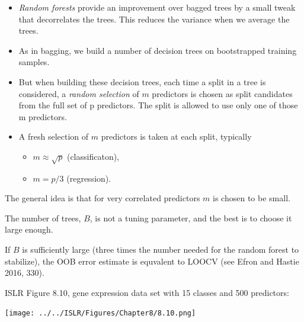 \documentclass[10pt,ignorenonframetext,]{beamer}
\providecommand{\tightlist}{%
  \setlength{\itemsep}{0pt}\setlength{\parskip}{0pt}}
\begin{document}
\begin{frame}

\begin{itemize}
\item
  \emph{Random forests} provide an improvement over bagged trees by a
  small tweak that decorrelates the trees. This reduces the variance
  when we average the trees.
\item
  As in bagging, we build a number of decision trees on bootstrapped
  training samples.
\item
  But when building these decision trees, each time a split in a tree is
  considered, a \emph{random selection} of \(m\) predictors is chosen as
  split candidates from the full set of p predictors. The split is
  allowed to use only one of those m predictors.
\item
  A fresh selection of \(m\) predictors is taken at each split,
  typically

  \begin{itemize}
  \tightlist
  \item
    \(m\approx \sqrt p\) (classificaton),\\
  \item
    \(m=p/3\) (regression).
  \end{itemize}
\end{itemize}

\vspace{2mm}

The general idea is that for very correlated predictors \(m\) is chosen
to be small.

\end{frame}

\begin{frame}

The number of trees, \(B\), is not a tuning parameter, and the best is
to choose it large enough.

If \(B\) is sufficiently large (three times the number needed for the
random forest to stabilize), the OOB error estimate is equvalent to
LOOCV (see Efron and Hastie 2016, 330).

\end{frame}

\begin{frame}

ISLR Figure 8.10, gene expression data set with 15 classes and 500
predictors:

\centering
\texttt{[image: ../../ISLR/Figures/Chapter8/8.10.png]}

\end{frame}
\end{document}
